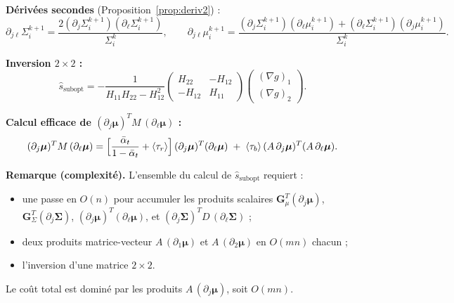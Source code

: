 \documentclass[12pt]{article}
\newcommand{\alt}{\bar\alpha_t}
\begin{document}
\begin{resultbox}
\noindent\textbf{Dérivées secondes} (Proposition~\ref{prop:deriv2}) :
\begin{equation}
\partial_{j\ell}\Sigma_i^{k+1} = \frac{2(\partial_j\Sigma_i^{k+1})(\partial_\ell\Sigma_i^{k+1})}{\Sigma_i^k}, \qquad \partial_{j\ell}\mu_i^{k+1} = \frac{(\partial_j\Sigma_i^{k+1})(\partial_\ell\mu_i^{k+1}) + (\partial_\ell\Sigma_i^{k+1})(\partial_j\mu_i^{k+1})}{\Sigma_i^k}.
\end{equation}

\noindent\textbf{Inversion $2\times 2$ :}
\begin{equation}
\hat{s}_{\mathrm{subopt}} = -\frac{1}{H_{11}H_{22} - H_{12}^2}\begin{pmatrix} H_{22} & -H_{12} \\ -H_{12} & H_{11} \end{pmatrix}\begin{pmatrix} (\nabla g)_1 \\ (\nabla g)_2 \end{pmatrix}.
\end{equation}

\noindent\textbf{Calcul efficace de $(\partial_j\boldsymbol{\mu})^T M\,(\partial_\ell\boldsymbol{\mu})$ :}
\begin{equation}
(\partial_j\boldsymbol{\mu})^T M\,(\partial_\ell\boldsymbol{\mu}) = \Bigl[\frac{\alt}{1-\alt} + \langle\tau_r\rangle\Bigr]\,(\partial_j\boldsymbol{\mu})^T(\partial_\ell\boldsymbol{\mu}) \;+\; \langle\tau_b\rangle\,(A\,\partial_j\boldsymbol{\mu})^T(A\,\partial_\ell\boldsymbol{\mu}).
\end{equation}
\end{resultbox}

\medskip

\noindent\textbf{Remarque (complexité).} L'ensemble du calcul de $\hat{s}_{\mathrm{subopt}}$ requiert :
\begin{itemize}
\item une passe en $O(n)$ pour accumuler les produits scalaires $\boldsymbol{G}_\mu^T(\partial_j\boldsymbol{\mu})$, $\boldsymbol{G}_\Sigma^T(\partial_j\boldsymbol{\Sigma})$, $(\partial_j\boldsymbol{\mu})^T(\partial_\ell\boldsymbol{\mu})$, et $(\partial_j\boldsymbol{\Sigma})^T D\,(\partial_\ell\boldsymbol{\Sigma})$ ;
\item deux produits matrice-vecteur $A\,(\partial_1\boldsymbol{\mu})$ et $A\,(\partial_2\boldsymbol{\mu})$ en $O(mn)$ chacun ;
\item l'inversion d'une matrice $2\times 2$.
\end{itemize}
Le coût total est dominé par les produits $A\,(\partial_j\boldsymbol{\mu})$, soit $O(mn)$. 
\end{document}
